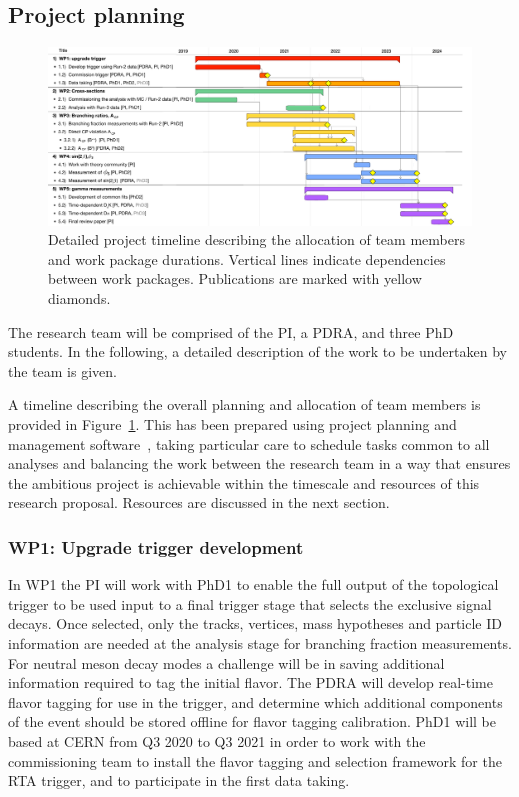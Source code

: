 \documentclass[11pt,a4paper]{article}
\begin{document}
\subsection{Project planning}
\begin{figure}[h!]
\begin{center}
\includegraphics[width=\textwidth]{figs/Gantt_B2_forPublication.pdf}
\caption{\label{fig:timeline} Detailed project timeline describing the allocation of team members and work package durations. Vertical lines indicate dependencies between work packages. Publications are marked with yellow diamonds.}
\end{center}
\end{figure}

The research team will be comprised of the PI, a PDRA, and three PhD students. In the following, a detailed description of the work to be undertaken by the team is given. 

A timeline describing the overall planning and allocation of team members is provided in Figure~\ref{fig:timeline}. This has been prepared using project planning and management software~\cite{omni:plan}, taking particular care to schedule tasks common to all analyses and balancing the work between the research team in a way that ensures the ambitious project is achievable within the timescale and resources of this research proposal. Resources are discussed in the next section.

\subsubsection{WP1: Upgrade trigger development}
In WP1 the PI will work with PhD1 to enable the full output of the topological trigger to be used input to a final trigger stage that selects the exclusive signal decays. Once selected, only the tracks, vertices, mass hypotheses and particle ID information are needed at the analysis stage for branching fraction measurements. For neutral \PB meson decay modes a challenge will be in saving  additional information required to tag the initial flavor. The PDRA will develop real-time flavor tagging for use in the trigger, and determine which additional components of the event should be stored offline for flavor tagging calibration. PhD1 will be based at CERN from Q3 2020 to Q3 2021 in order to work with the commissioning team to install the flavor tagging and selection framework for the RTA trigger, and to participate in the first data taking. 
\end{document}

